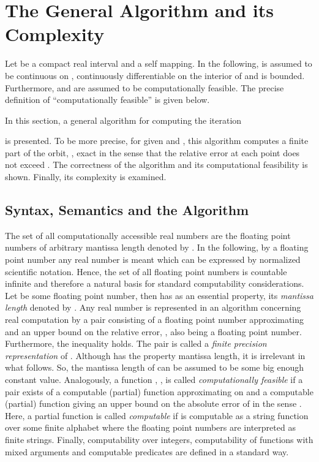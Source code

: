 \documentclass[copyright,creativecommons]{eptcs}
\theoremstyle{definition}
\begin{document}
\section{The General Algorithm and its Complexity}
Let  be a compact real interval and  a self mapping. In the following,
 is assumed to be continuous on , continuously differentiable on the interior
of  and  is bounded. Furthermore,  and  are assumed to be
computationally feasible. The precise definition of ``computationally feasible''
is given below.

In this section, a general algorithm for computing the iteration

is presented. To be more precise, for given  and ,
this algorithm computes a finite part of the orbit,
, exact in the sense that the relative
error at each point  does not exceed .
The correctness of the algorithm and its computational feasibility is shown.
Finally, its complexity is examined.


\subsection{Syntax, Semantics and the Algorithm}
The set of all computationally accessible real numbers are the floating
point numbers of arbitrary mantissa length denoted by .
In the following, by a floating point number any real number
is meant which can be expressed by normalized scientific notation.
Hence, the set  of all floating point 
numbers is countable infinite and therefore a natural basis for standard
computability considerations. Let  be some floating
point number, then  has as an essential property, its
{\em mantissa length} denoted by .
Any real number  is represented in an algorithm concerning real
computation by a pair  consisting of a floating
point number  approximating  and an upper bound on the
relative error, , also being a floating point number.
Furthermore, the inequality  holds. The pair
 is called a {\em finite precision representation} of .
Although  has the property mantissa length, it is irrelevant
in what follows. So, the mantissa length of  can be assumed
to be some big enough constant value. Analogously, a function ,
, is called {\em computationally feasible} if a pair
 exists of a computable (partial) function 
approximating  on  and a computable (partial) function
 giving an upper bound on the
absolute error of  in the sense
. Here, a partial function
 is called {\em computable}
if  is computable as a string function over some finite
alphabet where the floating point numbers are interpreted as
finite strings. Finally, computability over integers, computability
of functions with mixed arguments and computable predicates are
defined in a standard way.
\end{document}
